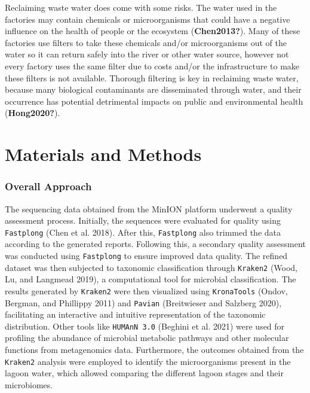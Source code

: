 \documentclass[
]{article}
\begin{document}
Reclaiming waste water does come with some risks. The water used in the
factories may contain chemicals or microorganisms that could have a
negative influence on the health of people or the ecosystem
(\textbf{Chen2013?}). Many of these factories use filters to take these
chemicals and/or microorganisms out of the water so it can return safely
into the river or other water source, however not every factory uses the
same filter due to costs and/or the infrastructure to make these filters
is not available. Thorough filtering is key in reclaiming waste water,
because many biological contaminants are disseminated through water, and
their occurrence has potential detrimental impacts on public and
environmental health (\textbf{Hong2020?}).

\hypertarget{materials-and-methods}{%
\section{Materials and Methods}\label{materials-and-methods}}

\hypertarget{overall-approach}{%
\subsubsection{Overall Approach}\label{overall-approach}}

The sequencing data obtained from the MinION platform underwent a
quality assessment process. Initially, the sequences were evaluated for
quality using \texttt{Fastplong} (Chen et al. 2018). After this,
\texttt{Fastplong} also trimmed the data according to the generated
reports. Following this, a secondary quality assessment was conducted
using \texttt{Fastplong} to ensure improved data quality. The refined
dataset was then subjected to taxonomic classification through
\texttt{Kraken2} (Wood, Lu, and Langmead 2019), a computational tool for
microbial classification. The results generated by \texttt{Kraken2} were
then visualized using \texttt{KronaTools} (Ondov, Bergman, and Phillippy
2011) and \texttt{Pavian} (Breitwieser and Salzberg 2020), facilitating
an interactive and intuitive representation of the taxonomic
distribution. Other tools like \texttt{HUMAnN\ 3.0} (Beghini et al.
2021) were used for profiling the abundance of microbial metabolic
pathways and other molecular functions from metagenomics data.
Furthermore, the outcomes obtained from the \texttt{Kraken2} analysis
were employed to identify the microorganisms present in the lagoon
water, which allowed comparing the different lagoon stages and their
microbiomes.
\end{document}
